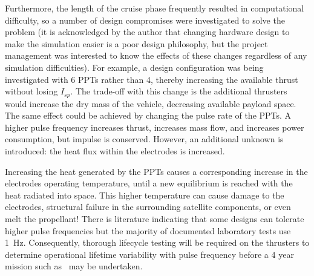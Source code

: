 Furthermore, the length of the cruise phase frequently resulted in computational difficulty, so a number of design compromises were investigated to solve the problem (it is acknowledged by the author that changing hardware design to make the simulation easier is a poor design philosophy, but the project management was interested to know the effects of these changes regardless of any simulation difficulties). For example, a design configuration was being investigated with 6 PPTs rather than 4, thereby increasing the available thrust without losing $I_{sp}$. The trade-off with this change is the additional thrusters would increase the dry mass of the vehicle, decreasing available payload space. The same effect could be achieved by changing the pulse rate of the PPTs. A higher pulse frequency increases thrust, increases mass flow, and increases power consumption, but impulse is conserved. However, an additional unknown is introduced: the heat flux within the electrodes is increased. 


Increasing the heat generated by the PPTs causes a corresponding increase in the electrodes operating temperature, until a new equilibrium is reached with the heat radiated into space. This higher temperature can cause damage to the electrodes, structural failure in the surrounding satellite components, or even melt the propellant! There is literature indicating that some designs can tolerate higher pulse frequencies \parencite{Mueller2000} but the majority of documented laboratory tests use 1~Hz. Consequently, thorough lifecycle testing will be required on the thrusters to determine operational lifetime variability with pulse frequency before a 4 year mission such as \BW\ may be undertaken. 


